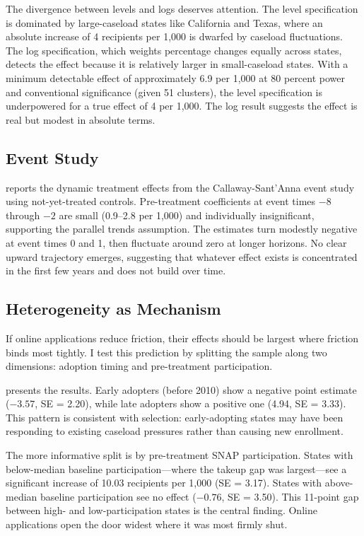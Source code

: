 \documentclass[12pt]{article}
\begin{document}
The divergence between levels and logs deserves attention. The level specification is dominated by large-caseload states like California and Texas, where an absolute increase of 4 recipients per 1,000 is dwarfed by caseload fluctuations. The log specification, which weights percentage changes equally across states, detects the effect because it is relatively larger in small-caseload states. With a minimum detectable effect of approximately 6.9 per 1,000 at 80 percent power and conventional significance (given 51 clusters), the level specification is underpowered for a true effect of 4 per 1,000. The log result suggests the effect is real but modest in absolute terms.



\subsection{Event Study}

 reports the dynamic treatment effects from the Callaway-Sant'Anna event study using not-yet-treated controls. Pre-treatment coefficients at event times $-8$ through $-2$ are small (0.9--2.8 per 1,000) and individually insignificant, supporting the parallel trends assumption. The estimates turn modestly negative at event times 0 and 1, then fluctuate around zero at longer horizons. No clear upward trajectory emerges, suggesting that whatever effect exists is concentrated in the first few years and does not build over time.



\subsection{Heterogeneity as Mechanism}

If online applications reduce friction, their effects should be largest where friction binds most tightly. I test this prediction by splitting the sample along two dimensions: adoption timing and pre-treatment participation.

 presents the results. Early adopters (before 2010) show a negative point estimate ($-3.57$, SE = 2.20), while late adopters show a positive one (4.94, SE = 3.33). This pattern is consistent with selection: early-adopting states may have been responding to existing caseload pressures rather than causing new enrollment.

The more informative split is by pre-treatment SNAP participation. States with below-median baseline participation---where the takeup gap was largest---see a significant increase of 10.03 recipients per 1,000 (SE = 3.17). States with above-median baseline participation see no effect ($-0.76$, SE = 3.50). This 11-point gap between high- and low-participation states is the central finding. Online applications open the door widest where it was most firmly shut.
\end{document}
